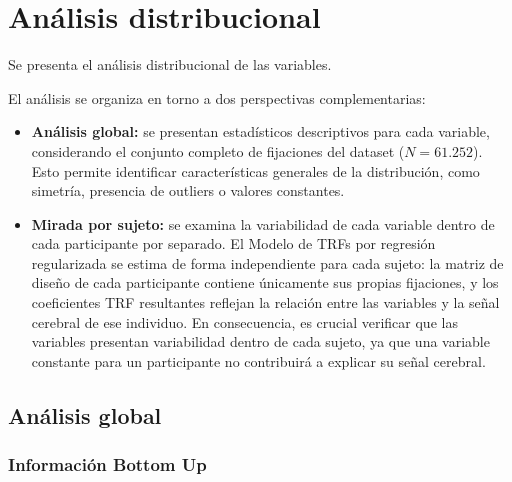 \section{Análisis distribucional}
\label{sec:analisis_distribucional}

%
%
%

Se presenta el análisis distribucional de las variables.

El análisis se organiza en torno a dos perspectivas complementarias:
\begin{itemize}
    \item \textbf{Análisis global:} se presentan estadísticos descriptivos para cada variable, considerando el conjunto completo de fijaciones del dataset ($N = 61.252$). Esto permite identificar características generales de la distribución, como simetría, presencia de outliers o valores constantes.
    
    \item \textbf{Mirada por sujeto:} se examina la variabilidad de cada variable dentro de cada participante por separado. El Modelo de TRFs por regresión regularizada se estima de forma independiente para cada sujeto: la matriz de diseño de cada participante contiene únicamente sus propias fijaciones, y los coeficientes TRF resultantes reflejan la relación entre las variables y la señal cerebral de ese individuo. En consecuencia, es crucial verificar que las variables presentan variabilidad dentro de cada sujeto, ya que una variable constante para un participante no contribuirá a explicar su señal cerebral.
\end{itemize}


\subsection{Análisis global}
\subsubsection{Información Bottom Up}

